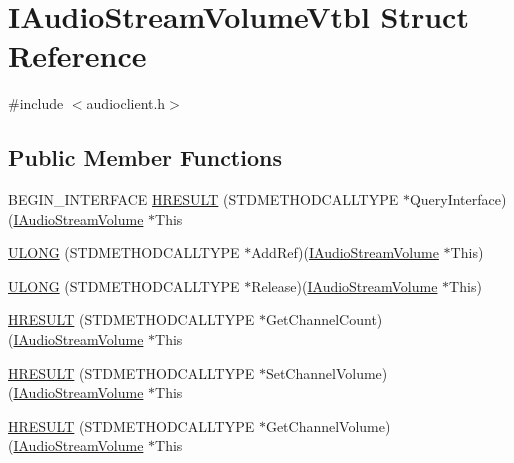 \hypertarget{struct_i_audio_stream_volume_vtbl}{}\section{I\+Audio\+Stream\+Volume\+Vtbl Struct Reference}
\label{struct_i_audio_stream_volume_vtbl}


{\ttfamily \#include $<$audioclient.\+h$>$}

\subsection*{Public Member Functions}
\begin{DoxyCompactItemize}
\item 
B\+E\+G\+I\+N\+\_\+\+I\+N\+T\+E\+R\+F\+A\+CE \hyperlink{struct_i_audio_stream_volume_vtbl_a36d55a1790779ef8aae7e63dd2b023c1}{H\+R\+E\+S\+U\+LT} (S\+T\+D\+M\+E\+T\+H\+O\+D\+C\+A\+L\+L\+T\+Y\+PE $\ast$Query\+Interface)(\hyperlink{audioclient_8h_ae2909fedf5fb48235bdf718200c31024}{I\+Audio\+Stream\+Volume} $\ast$This
\item 
\hyperlink{struct_i_audio_stream_volume_vtbl_a080f97754171865032ed9c0a1ad6a710}{U\+L\+O\+NG} (S\+T\+D\+M\+E\+T\+H\+O\+D\+C\+A\+L\+L\+T\+Y\+PE $\ast$Add\+Ref)(\hyperlink{audioclient_8h_ae2909fedf5fb48235bdf718200c31024}{I\+Audio\+Stream\+Volume} $\ast$This)
\item 
\hyperlink{struct_i_audio_stream_volume_vtbl_a4e0397b1a745e3eabb2eb8d36aa35d27}{U\+L\+O\+NG} (S\+T\+D\+M\+E\+T\+H\+O\+D\+C\+A\+L\+L\+T\+Y\+PE $\ast$Release)(\hyperlink{audioclient_8h_ae2909fedf5fb48235bdf718200c31024}{I\+Audio\+Stream\+Volume} $\ast$This)
\item 
\hyperlink{struct_i_audio_stream_volume_vtbl_a94d0ef3ae2e2185a617ee64269d2e1a7}{H\+R\+E\+S\+U\+LT} (S\+T\+D\+M\+E\+T\+H\+O\+D\+C\+A\+L\+L\+T\+Y\+PE $\ast$Get\+Channel\+Count)(\hyperlink{audioclient_8h_ae2909fedf5fb48235bdf718200c31024}{I\+Audio\+Stream\+Volume} $\ast$This
\item 
\hyperlink{struct_i_audio_stream_volume_vtbl_a41db04c655f42bbc3c173a8069e8d854}{H\+R\+E\+S\+U\+LT} (S\+T\+D\+M\+E\+T\+H\+O\+D\+C\+A\+L\+L\+T\+Y\+PE $\ast$Set\+Channel\+Volume)(\hyperlink{audioclient_8h_ae2909fedf5fb48235bdf718200c31024}{I\+Audio\+Stream\+Volume} $\ast$This
\item 
\hyperlink{struct_i_audio_stream_volume_vtbl_ade8c125032d53613283d88d0c21571a5}{H\+R\+E\+S\+U\+LT} (S\+T\+D\+M\+E\+T\+H\+O\+D\+C\+A\+L\+L\+T\+Y\+PE $\ast$Get\+Channel\+Volume)(\hyperlink{audioclient_8h_ae2909fedf5fb48235bdf718200c31024}{I\+Audio\+Stream\+Volume} $\ast$This

\end{DoxyCompactItemize}
